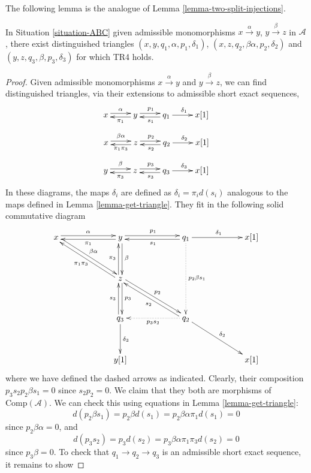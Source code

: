 \noindent
The following lemma is the analogue of Lemma \ref{lemma-two-split-injections}.

\begin{lemma}
\label{lemma-dgc-analogue-tr4}
In Situation \ref{situation-ABC} given admissible monomorphisms
$x \xrightarrow{\alpha} y$, $y \xrightarrow{\beta} z$ in $\mathcal{A}$,
there exist distinguished triangles
$(x,y,q_1,\alpha,p_1,\delta_1)$, $(x,z,q_2,\beta\alpha,p_2,\delta_2)$
and $(y,z,q_3,\beta,p_3,\delta_3)$ for which TR4 holds.
\end{lemma}

\begin{proof}
Given admissible monomorphisms $x\xrightarrow{\alpha} y$ and
$y\xrightarrow{\beta}z$, we can find distinguished triangles,
via their extensions to admissible short exact sequences,
$$
\xymatrix{
x\ar@<0.5ex>[r]^{\alpha} &
y\ar@<0.5ex>[l]^{\pi_1} \ar@<0.5ex>[r]^{p_1} &
q_1 \ar[r]^{\delta_1} \ar@<0.5ex>[l]^{s_1} &
x[1]
}
$$
$$
\xymatrix{
x\ar@<0.5ex>[r]^{\beta\alpha} &
z\ar@<0.5ex>[l]^{\pi_1\pi_3} \ar@<0.5ex>[r]^{p_2} &
q_2 \ar[r]^{\delta_2} \ar@<0.5ex>[l]^{s_2} &
x[1]
}
$$
$$
\xymatrix{
y\ar@<0.5ex>[r]^{\beta} &
z\ar@<0.5ex>[l]^{\pi_3} \ar@<0.5ex>[r]^{p_3} &
q_3 \ar[r]^{\delta_3} \ar@<0.5ex>[l]^{s_3} &
x[1]
}
$$
In these diagrams, the maps $\delta_i$ are defined as
$\delta_i = \pi_i d(s_i)$ analogous to the maps defined in
Lemma \ref{lemma-get-triangle}.
They fit in the following solid commutative diagram
$$
\xymatrix@C=5pc@R=3pc{
x\ar@<0.5ex>[r]^{\alpha} \ar@<0.5ex>[dr]^{\beta\alpha} &
y\ar@<0.5ex>[d]^{\beta} \ar@<0.5ex>[l]^{\pi_1} \ar@<0.5ex>[r]^{p_1} &
q_1 \ar[r]^{\delta_1} \ar@<0.5ex>[l]^{s_1} \ar@{.>}[dd]^{p_2\beta s_1} &
x[1] \\
 &
z \ar@<0.5ex>[u]^{\pi_3}\ar@<0.5ex>[d]^{p_3}
\ar@<0.5ex>[dr]^{p_2} \ar@<0.5ex>[ul]^{\pi_1\pi_3} & & \\
 &
q_3\ar@<0.5ex>[u]^{s_3} \ar[d]^{\delta_3} &
q_2 \ar@{.>}[l]^{p_3s_2} \ar@<0.5ex>[ul]^{s_2} \ar[dr]^{\delta_2} \\
 &
y[1] & & x[1]}
$$
where we have defined the dashed arrows as indicated.
Clearly, their composition $p_3s_2p_2\beta s_1 = 0$
since $s_2p_2 = 0$. We claim that they both are morphisms of
$\text{Comp}(\mathcal{A})$. We can check this using equations in
Lemma \ref{lemma-get-triangle}:
$$
d(p_2\beta s_1) = p_2\beta d(s_1) = p_2\beta\alpha\pi_1 d(s_1) = 0
$$
since $p_2\beta\alpha = 0$, and
$$
d(p_3s_2) = p_3d(s_2) = p_3\beta\alpha\pi_1\pi_3 d(s_2) = 0
$$
since $p_3\beta = 0$. To check that $q_1\to q_2\to q_3$
is an admissible short exact sequence, it remains to show

\end{proof}

